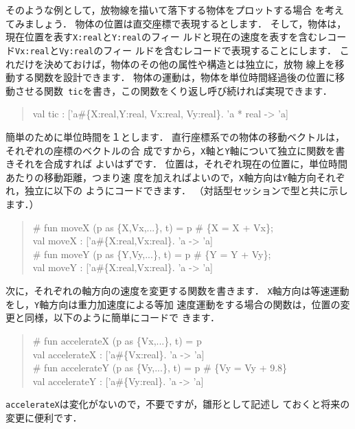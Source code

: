 \documentclass{jbook}
\begin{document}
	そのような例として，放物線を描いて落下する物体をプロットする場合
を考えてみましょう． 
	物体の位置は直交座標で表現するとします．
	そして，物体は，現在位置を表す{\tt X:real}と{\tt Y:real}のフィー
ルドと現在の速度を表すを含むレコード{\tt Vx:real}と{\tt Vy:real}のフィー
ルドを含むレコードで表現することにします．
	これだけを決めておけば，物体のその他の属性や構造とは独立に，放物
線上を移動する関数を設計できます．
	物体の運動は，物体を単位時間経過後の位置に移動させる関数{\tt
tic}を書き，この関数をくり返し呼び続ければ実現できます．
\begin{tt}\begin{quote}
val tic : ['a\#\{X:real,Y:real, Vx:real, Vy:real\}. 'a * real -> 'a]
\end{quote}\end{tt}
	簡単のために単位時間を１とします．
	直行座標系での物体の移動ベクトルは，それぞれの座標のベクトルの合
成ですから，{\tt X}軸と{\tt Y}軸について独立に関数を書きそれを合成すれば
よいはずです．
	位置は，それぞれ現在の位置に，単位時間あたりの移動距離，つまり速
度を加えればよいので，{\tt X}軸方向は{\tt Y}軸方向それぞれ，独立に以下の
ようにコードできます．
	（対話型セッションで型と共に示します．）
\begin{tt}\begin{quote}
\# fun moveX (p as \{X,Vx,...\}, t) = p \# \{X = X + Vx\};\\
val moveX : ['a\#\{X:real,Vx:real\}. 'a -> 'a]\\
\# fun moveY (p as \{Y,Vy,...\}, t) = p \# \{Y = Y + Vy\};\\
val moveY : ['a\#\{X:real,Vx:real\}. 'a -> 'a]
\end{quote}\end{tt}
	次に，それぞれの軸方向の速度を変更する関数を書きます．
	{\tt X}軸方向は等速運動をし，{\tt Y}軸方向は重力加速度による等加
速度運動をする場合の関数は，位置の変更と同様，以下のように簡単にコードで
きます．
\begin{tt}\begin{quote}
\# fun accelerateX (p as \{Vx,...\}, t) = p\\
val accelerateX : ['a\#\{Vx:real\}. 'a -> 'a]\\
\# fun accelerateY (p as \{Vy,...\}, t) = p \# \{Vy = Vy + 9.8\}\\
val accelerateY : ['a\#\{Vy:real\}. 'a -> 'a]\\
\end{quote}\end{tt}
	{\tt accelerateX}は変化がないので，不要ですが，雛形として記述し
ておくと将来の変更に便利です．
	
\end{document}

